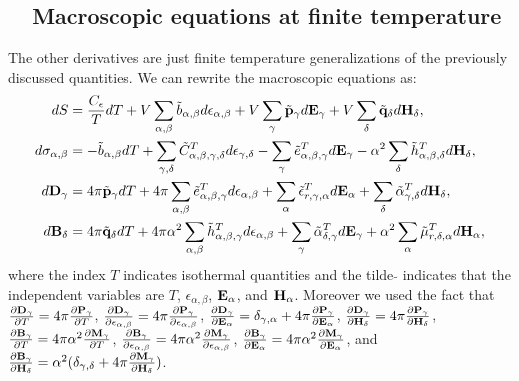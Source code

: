 \documentclass[12pt,a4paper,twoside]{report}
\begin{document}
{\subsection{\color{web-blue}\ \ Macroscopic equations at finite temperature}
The other derivatives are just finite temperature generalizations of the
previously discussed quantities. We can rewrite the macroscopic equations as:
\begin{align}
dS&= {C_\epsilon\over T} dT+ V \sum_{\alpha,\beta} \tilde b_{\alpha,\beta} 
d\epsilon_{\alpha,\beta}
+ V \sum_\gamma \tilde {\bf p}_\gamma d{\bf E}_{\gamma} + 
V \sum_\delta \tilde {\bf q}_\delta d{\bf H}_{\delta}, \\
d\sigma_{\alpha,\beta}&= -\tilde b_{\alpha,\beta} dT + 
\sum_{\gamma,\delta} \tilde C^T_{\alpha,\beta,\gamma,\delta} 
d \epsilon_{\gamma,\delta} - \sum_\gamma \tilde e^T_{\alpha,\beta,\gamma} 
d{\bf E}_{\gamma} -\alpha^2
\sum_\delta \tilde h^T_{\alpha,\beta,\delta} d{\bf H}_{\delta}, \\
d{\bf D}_\gamma&=
4 \pi \tilde {\bf p}_\gamma dT + 4 \pi \sum_{\alpha,\beta} \tilde 
e^T_{\alpha,\beta,\gamma} d\epsilon_{\alpha,\beta}
+\sum_\alpha \tilde \epsilon^T_{r,\gamma,\alpha} 
d{\bf E}_{\alpha} + 
\sum_\delta \tilde \alpha^T_{\gamma,\delta} d{\bf H}_{\delta}, 
\label{dau} \\
d{\bf B}_\delta&=
4 \pi \tilde {\bf q}_\delta dT+ 4 \pi \alpha^2 \sum_{\alpha,\beta}
\tilde h^T_{\alpha,\beta,\gamma}
d\epsilon_{\alpha,\beta}
+\sum_\gamma \tilde \alpha^T_{\delta,\gamma}
d{\bf E}_{\gamma}+ \alpha^2
\sum_\alpha \tilde \mu^{T}_{r,\delta,\alpha}
d{\bf H}_{\alpha}, \label{bau} 
\end{align}
where the index $T$ indicates isothermal quantities and 
the tilde $\tilde{ }$ indicates that the independent variables are
$T$, $\epsilon_{\alpha,\beta}$, ${\bf E}_\alpha$, and ${\bf H}_\alpha$. 
Moreover we used the fact
that 
${\partial {\bf D}_\gamma \over \partial T} =
4 \pi {\partial {\bf P}_\gamma \over \partial T}$,
${\partial {\bf D}_\gamma \over \partial \epsilon_{\alpha,\beta}}=
4 \pi {\partial {\bf P}_\gamma \over \partial \epsilon_{\alpha,\beta}}$,
${\partial {\bf D}_\gamma \over \partial {\bf E}_{\alpha}}=  
\delta_{\gamma,\alpha} + 4 \pi 
{\partial {\bf P}_\gamma \over \partial {\bf E}_{\alpha}}$, 
${\partial {\bf D}_\gamma \over \partial {\bf H}_{\delta}}= 
4 \pi {\partial {\bf P}_\gamma \over \partial {\bf H}_{\delta}}$, 
${\partial {\bf B}_\gamma \over \partial T} = 4 \pi \alpha^2
{\partial {\bf M}_\gamma \over \partial T}$,
${\partial {\bf B}_\gamma \over \partial \epsilon_{\alpha,\beta}}= 4 \pi 
\alpha^2 {\partial {\bf M}_\gamma \over \partial \epsilon_{\alpha,\beta}}$,
${\partial {\bf B}_\gamma \over \partial {\bf E}_{\alpha}}= 4 \pi \alpha^2
{\partial {\bf M}_\gamma \over \partial {\bf E}_{\alpha}}$, and
${\partial {\bf B}_\gamma \over \partial {\bf H}_{\delta}}= \alpha^2
(\delta_{\gamma,\delta} + 4 \pi
{\partial {\bf M}_\gamma \over \partial {\bf H}_{\delta}})$. 

}
\end{document}
